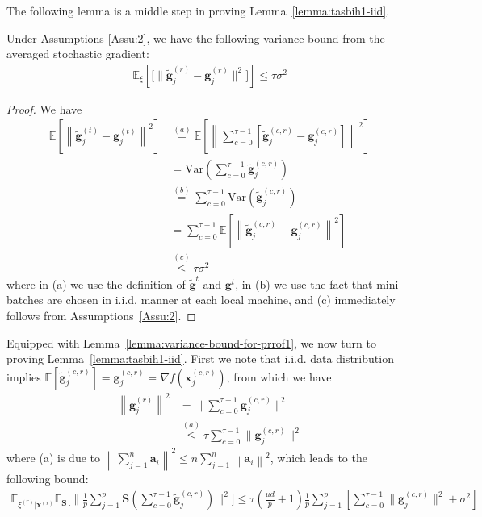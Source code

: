 The following lemma is a middle step in proving Lemma~\ref{lemma:tasbih1-iid}.

\begin{lemma}\label{lemma:variance-bound-for-prrof1}
Under Assumptions \ref{Assu:2}, we have the following variance bound from the averaged stochastic gradient:
\begin{align}
    \mathbb{E}_{\xi}\left[\Big[\|{\tilde{\mathbf{g}}_j^{(r)}}-{\mathbf{g}_j^{(r)}}\|^2\Big]\right]\leq \tau \sigma^2
\end{align}
\end{lemma}

\begin {proof}
We have
\begin{align}
    \mathbb{E}\left[\left\|{\tilde{\mathbf{g}}_j^{(t)}}-{\mathbf{g}_j^{(t)}}\right\|^2\right]&\stackrel{(a)}{=}\mathbb{E}\left[\left\|\sum_{c=0}^{\tau-1}\left[\tilde{\mathbf{g}}_j^{(c,r)}-\mathbf{g}_j^{(c,r)}\right]\right\|^2\right]\nonumber\\
    &{=}\text{Var}\left(\sum_{c=0}^{\tau-1}\tilde{\mathbf{g}}_j^{(c,r)}\right)\nonumber\\
    &\stackrel{(b)}{=}\sum_{c=0}^{\tau-1}\text{Var}\left(\tilde{\mathbf{g}}_j^{(c,r)}\right)\nonumber\\
    &{=}\sum_{c=0}^{\tau-1}\mathbb{E}\left[\left\|\tilde{\mathbf{g}}_j^{(c,r)}-\mathbf{g}_j^{(c,r)}\right\|^2\right]\nonumber\\
    &\stackrel{(c)}{\leq}\tau\sigma^2\label{eq:var_b_mid}
    \end{align}
where in (a) we use the definition of ${\tilde{\mathbf{g}}}^t$ and ${{\mathbf{g}}}^t$, in (b) we use the fact that mini-batches are chosen in i.i.d. manner at each local machine, and (c) immediately follows from Assumptions~\ref{Assu:2}.
\end{proof}
Equipped with Lemma~\ref{lemma:variance-bound-for-prrof1}, we now turn to proving Lemma~\ref{lemma:tasbih1-iid}. First we note that i.i.d. data distribution implies $\mathbb{E}[{\tilde{\mathbf{g}}}_j^{(c,r)}]=\mathbf{g}_j^{(c,r)}=\nabla{f}(\boldsymbol{x}_j^{(c,r)})$, from which we have
\begin{align}
\left\|{\mathbf{g}}_j^{(r)}\right\|^2&=\|\sum_{c=0}^{\tau-1}\mathbf{g}_j^{(c,r)}\|^2\nonumber\\
&\stackrel{(a)}{\leq} \tau\sum_{c=0}^{\tau-1}\|\mathbf{g}_j^{(c,r)}\|^2\label{eq:mid-bounding-absg}
\end{align} 
where (a) is due to $\left\|\sum_{j=1}^n\mathbf{a}_i\right\|^2\leq n\sum_{j=1}^n\left\|\mathbf{a}_i\right\|^2$, which leads to the following bound:
\begin{align}
    \mathbb{E}_{\xi^{(r)}|\boldsymbol{x}^{(r)}}\mathbb{E}_{\mathbf{S}}\Big[\|\frac{1}{p}\sum_{j=1}^p \mathbf{S}\left(\sum_{c=0}^{\tau-1}\tilde{\mathbf{g}}^{(c,r)}_j\right)\|^2\Big]\leq\tau(\frac{\mu d}{p}+1)\frac{1}{p}\sum_{j=1}^p\left[\sum_{c=0}^{\tau-1}\|\mathbf{g}_j^{(c,r)}\|^2+\sigma^2\right] 
\end{align}

